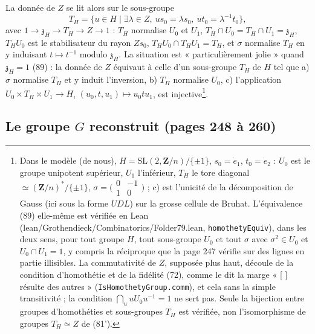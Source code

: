 \documentclass[11pt,a4paper]{article}
\begin{document}
La donnée de $Z$ se lit alors sur le sous-groupe
\[
  T_H = \{u \in H \mid \exists \lambda \in Z,\ us_0 = \lambda s_0,\ ut_0 =
  \lambda^{-1}t_0\} ,
\]
avec $1 \to \mathfrak{z}_H \to T_H \to Z \to 1$ : $T_H$ normalise $U_0$ et
$U_1$, $T_H \cap U_0 = T_H \cap U_1 = \mathfrak{z}_H$, $T_H U_0$ est le
stabilisateur du rayon $Z s_0$, $T_H U_0 \cap T_H U_1 = T_H$, et $\sigma$
normalise $T_H$ en y induisant $t \mapsto t^{-1}$ modulo $\mathfrak{z}_H$. La
situation est « particulièrement jolie » quand $\mathfrak{z}_H = 1$ (89) : la
donnée de $Z$ équivaut à celle d'un sous-groupe $T_H$ de $H$ tel que a) $\sigma$
normalise $T_H$ et y induit l'inversion, b) $T_H$ normalise $U_0$, c)
l'application $U_0 \times T_H \times U_1 \to H$, $(u_0, t, u_1) \mapsto u_0 t
u_1$, est injective\footnote{Dans le modèle (de nous), $H = \mathrm{SL}(2,
\mathbf{Z}/n)/\{\pm 1\}$, $s_0 = \dot e_1$, $t_0 = \dot e_2$ : $U_0$ est le
groupe unipotent supérieur, $U_1$ l'inférieur, $T_H$ le tore diagonal $\simeq
(\mathbf{Z}/n)^{*}/\{\pm 1\}$, $\sigma = \bigl(\begin{smallmatrix} 0 & -1 \\ 1 &
0 \end{smallmatrix}\bigr)$ ; c) est l'unicité de la décomposition de Gauss (ici
sous la forme $UDL$) sur la grosse cellule de Bruhat. L'équivalence (89)
elle-même est vérifiée en Lean (lean/Grothendieck/Combinatorics/Folder79.lean,
\texttt{homothetyEquiv}), dans les deux sens, pour tout groupe $H$, tout
sous-groupe $U_0$ et tout $\sigma$ avec $\sigma^2 \in U_0$ et $U_0 \cap U_1 =
1$, y compris la réciproque que la page 247 vérifie sur des lignes en partie
illisibles. La commutativité de $Z$, supposée plus haut, découle de la
condition d'homothétie et de la fidélité (72), comme le dit la marge
« [ ] résulte des autres » (\texttt{IsHomothetyGroup.comm}), et cela sans la
simple transitivité ; la condition $\bigcap_u uU_0u^{-1} = 1$ ne sert pas.
Seule la bijection entre groupes d'homothéties et sous-groupes $T_H$ est
vérifiée, non l'isomorphisme de groupes $T_H \simeq Z$ de (81').}.

\subsection*{Le groupe $G$ reconstruit (pages 248 à 260)}
\end{document}

